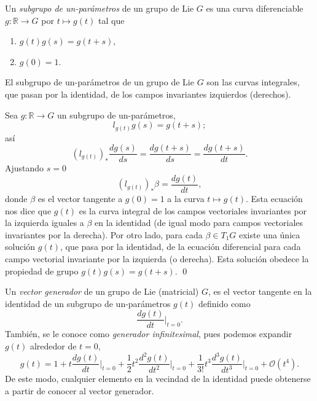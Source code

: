 \begin{mydef}  \cite{Kobayashi}
Un \emph{subgrupo de un-par\'{a}metros} de un grupo de Lie $G$ es una curva diferenciable $g: \mathbb{R} \rightarrow G$ por $t \mapsto g (t)$ tal que
%
\begin{enumerate}
\item{$g (t) g (s) = g (t + s)$,}
\item{$g (0) = 1$.}
\end{enumerate}
%
\end{mydef}

\begin{thm} \cite{Kobayashi}
El subgrupo de un-par\'{a}metros de un grupo de Lie $G$ son las curvas integrales, que pasan por la identidad, de los campos invariantes izquierdos (derechos).
\end{thm}

\begin{dem}
Sea $g: \mathbb{R} \rightarrow G$ un subgrupo de un-par\'{a}metros, $$l_{g(t)} g(s) = g(t + s);$$ as\'{i} $$(l_{g(t)})_{*} \frac{d g(s)}{d s} = \frac{d g(t +s )}{d s} = \frac{d g(t + s)}{d t}.$$ Ajustando $s = 0$ $$(l_{g(t)})_{*} \beta = \frac{d g(t)}{d t},$$ donde $\beta$ es el vector tangente a $g (0) = 1$ a la curva $t \mapsto g (t)$. Esta ecuaci\'{o}n nos dice que $g (t)$ es la curva integral de los campos vectoriales invariantes por la izquierda iguales a $\beta$ en la identidad (de igual modo para campos vectoriales invariantes por la derecha). Por otro lado, para cada $\beta \in T_{1} G$ existe una \'{u}nica soluci\'{o}n $g (t)$, que pasa por la identidad, de la ecuaci\'{o}n diferencial para cada campo vectorial invariante por la izquierda (o derecha). Esta soluci\'{o}n obedece la propiedad de grupo $g (t) g (s) = g (t + s)$. \qed
\end{dem}

\begin{mydef}
Un \emph{vector generador} de un grupo de Lie (matricial) $G$, es el vector tangente en la identidad de un subgrupo de un-par\'{a}metros $g (t)$ definido como
%
\begin{equation}
\frac{d g (t)}{dt} \bigg\vert_{t=0}.
\end{equation}
%
Tambi\'{e}n, se le conoce como \emph{generador infinitesimal}, pues podemos expandir $g (t)$ alrededor de $t=0$, $$g (t) = 1 + t \frac{d g (t)}{dt} \bigg\vert_{t=0} + \frac{1}{2}  t^{2} \frac{d^{2} g (t)}{dt^{2}} \bigg\vert_{t=0} + \frac{1}{3 !} t^{3} \frac{d^{3} g (t)}{dt^{3}} \bigg\vert_{t=0} + \mathcal{O} (t^{4}).$$ De este modo, cualquier elemento en la vecindad de la identidad puede obtenerse a partir de conocer al vector generador.
\end{mydef}


